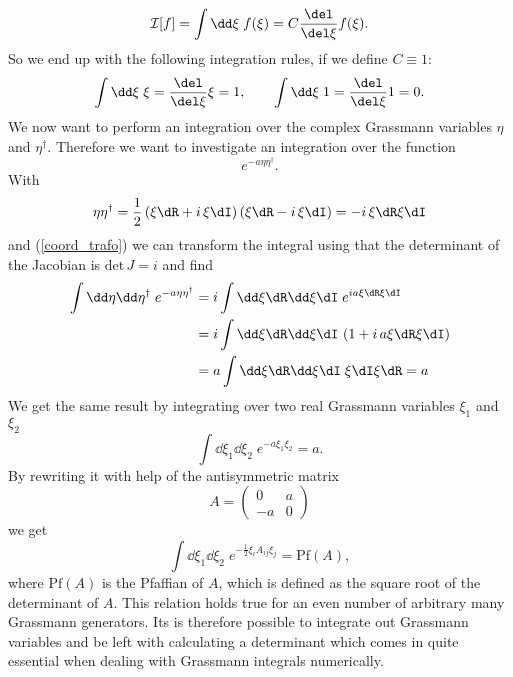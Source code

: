 \begin{equation}
\mathcal{I}[f]=\int \dd\xi\; f(\xi) = C\frac{\del }{\del\xi}f(\xi).
\end{equation}
So we end up with the following integration rules, if we define $C\equiv 1$:
\begin{equation}
\int \dd\xi\; \xi = \frac{\del }{\del\xi}\xi =1,\qquad \int \dd\xi\; 1 = \frac{\del }{\del\xi}1 =0.
\end{equation}
We now want to perform an integration over the complex Grassmann variables $\eta$ and $\eta^{\dagger}$. Therefore we want to investigate an integration over the function
\begin{equation}
e ^{-a\eta\eta^{\dagger}}.
\end{equation}
With
\begin{equation}
\eta\eta^{\dagger} = \frac{1}{2}\left(\xi\dR+i\,\xi\dI\right)\left(\xi\dR-i\, \xi\dI\right) = -i\,\xi\dR\xi\dI
\end{equation}
and (\ref{coord_trafo}) we can transform the integral using that the determinant of the Jacobian is $\mathrm{det}\,J=i$ and find
\begin{align}
\int \dd\eta\dd\eta^{\dagger}\;e ^{-a\eta\eta^{\dagger}} &= i\int \dd\xi\dR \dd\xi\dI\; e ^{ia\xi\dR\xi\dI}\notag \\
%
%
&=i\int\dd\xi\dR\dd\xi\dI\, \left( 1+ i\,a\xi\dR\xi\dI \right) \\
%
%
&=a \int\dd\xi\dR\dd\xi\dI \;\xi\dI\xi\dR = a \notag
\end{align}
We get the same result by integrating over two real Grassmann variables $\xi_{1}$ and $\xi_{2}$
\begin{equation}
\int \dd\xi_{1}\dd\xi_{2}\; e ^{-a\xi_{1}\xi_{2}}=a.
\end{equation}
By rewriting it with help of the antisymmetric matrix
\begin{equation}
A=\left(\begin{array}{cc}
0 & a \\
-a & 0
\end{array} \right)
\end{equation}
we get
\begin{equation}
\int \dd\xi_{1}\dd\xi_{2}\; e ^{-\frac{1}{2}\xi_{i}A_{ij}\xi_{j}} = \mathrm{Pf}\left(A\right),
\end{equation}
where $\mathrm{Pf}\left(A\right)$ is the Pfaffian of $A$, which is defined as the square root of the determinant of $A$. This relation holds true for an even number of arbitrary many Grassmann generators. Its is therefore possible to integrate out Grassmann variables and be left with calculating a determinant which comes in quite essential when dealing with Grassmann integrals numerically.\\[2cm]
%
%
%
%
%
%
%
%
